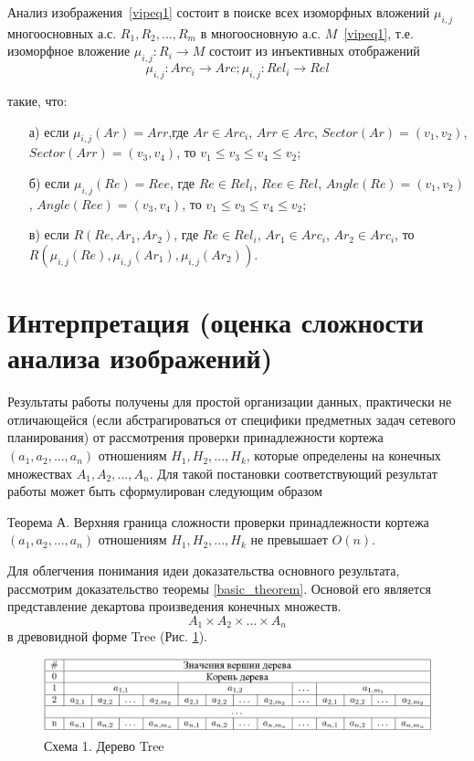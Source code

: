 Анализ изображения~\ref{vipeq1} состоит в поиске всех изоморфных вложений ${ \mu_{i,j} }$ многоосновных а.с. $R_1,R_2,...,R_m$ в многоосновную а.с. $M$~\ref{vipeq1}, т.е. изоморфное вложение $\mu_{i,j} : R_i \rightarrow M$ состоит из инъективных отображений
\begin{equation}
\mu_{i,j} : Arc_i \rightarrow Arc; \mu_{i,j} : Rel_i \rightarrow Rel
\label{vipeq4}
\end{equation}

такие, что:

\begin{enumerate}
\item[а)] если $\mu_{i,j}(Ar) = Arr$,где $Ar \in Arc_i$, $Arr \in Arc$, $Sector(Ar) = (v_1, v_2)$, $Sector(Arr) = (v_3, v_4)$, то $v_1 \le v_3 \le v_4 \le v_2$;
\item[б)] если $\mu_{i,j}(Re) = Ree$, где $Re \in Rel_i$, $Ree \in Rel$, $Angle(Re) = (v_1, v_2)$, $Angle(Ree) = (v_3, v_4)$, то $v_1 \le v_3 \le v_4 \le v_2$;
\item[в)] если $R(Re, Ar_1, Ar_2)$, где $Re \in Rel_i$, $Ar_1 \in Arc_i$, $Ar_2 \in Arc_i$, то $R(\mu_{i,j}(Re), \mu_{i,j}(Ar_1), \mu_{i,j}(Ar_2))$.
\end{enumerate}

\section{Интерпретация (оценка сложности анализа изображений)}
Результаты  работы \cite{Samara} получены для простой организации данных, практически не отличающейся (если абстрагироваться от специфики предметных задач сетевого планирования) от рассмотрения проверки принадлежности кортежа $(a_1,  a_2, ..., a_n)$   отношениям $H_1, H_2, ... , H_k$,  которые определены на конечных множествах $A_1,  A_2, ..., A_n$.
Для такой постановки соответствующий результат работы \cite{Samara}   может быть сформулирован следующим образом
\begin{theorem}
Теорема А.  Верхняя граница сложности проверки принадлежности кортежа 
$(a_1,  a_2, ..., a_n)$  отношениям $H_1, H_2, ... , H_k$  не превышает  $O(n)$.
\label{basic_theorem}
\end{theorem}
Для облегчения понимания идеи доказательства основного результата, рассмотрим доказательство теоремы \ref{basic_theorem}. Основой его является представление декартова произведения конечных множеств.
$$A_1 \times A_2 \times \ldots \times A_n$$
в древовидной форме Tree (Рис. \ref{tree}).

\begin{figure}[b]
\includegraphics[width=\linewidth,keepaspectratio]{images/an_tbl1}
\caption{Схема 1. Дерево Tree}
\label{tree}
\end{figure}


